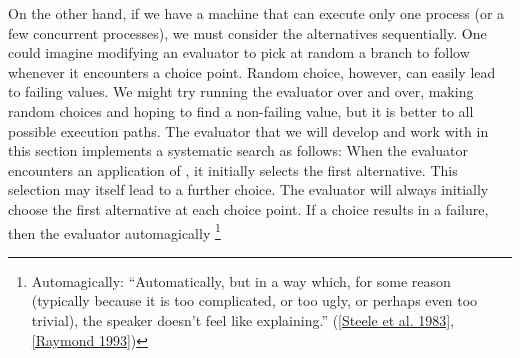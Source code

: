 On the other hand, if we have a machine that can execute only one process (or a few concurrent processes), we must consider the alternatives sequentially.
One could imagine modifying an evaluator to pick at random a branch to follow whenever it encounters a choice point.
Random choice, however, can easily lead to failing values.
We might try running the evaluator over and over, making random choices and hoping to find a non-failing value, but it is better to  all possible execution paths.
The  evaluator that we will develop and work with in this section implements a systematic search as follows:
When the evaluator encounters an application of , it initially selects the first alternative.
This selection may itself lead to a further choice.
The evaluator will always initially choose the first alternative at each choice point.
If a choice results in a failure, then the evaluator automagically%
\footnote{
	Automagically:
	“Automatically, but in a way which, for some reason (typically because it is too complicated, or too ugly, or perhaps even too trivial), the speaker doesn’t feel like explaining.”
	(\cref{Steele et al. 1983}, \cref{Raymond 1993})\label{Footnote 4.47}
}

